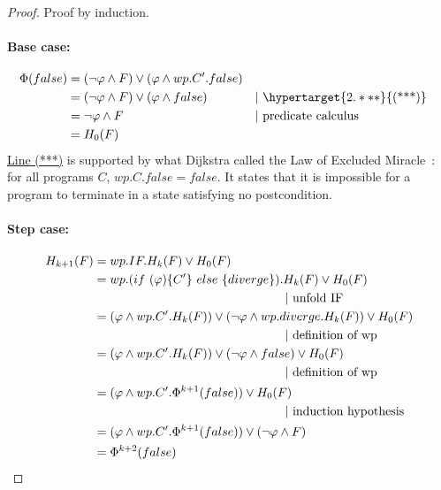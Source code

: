 \begin{proof}
Proof by induction. 
\vspace{-0.25cm}\paragraph{Base case: } 
  \begin{align*} 
    \Phi(false)   & = (\neg\varphi\wedge F)\vee(\varphi\wedge wp.C'.false)  & \\ 
                  & = (\neg\varphi\wedge F)\vee(\varphi\wedge false)         && |\ \hypertarget{2.***}{\text{(***)}}\\
                  & = \neg\varphi\wedge F                                    && |\ \text{predicate calculus} \\
                  & = H_0(F)
  \end{align*}
\hyperlink{2.***}{Line (***)} is supported by what Dijkstra called the Law of Excluded Miracle~\cite[p.18]{dijkstra76}: for all programs $C$, $wp.C.false = false$. 
It states that it is impossible for a program to terminate in a state satisfying no postcondition. 

\vspace{-0.25cm}\paragraph{Step case: } 
  \begin{align*} 
    H_{k+1}(F)     & = wp.IF.H_{k}(F) \vee H_0(F) \\
                  & = wp.(if\ (\varphi)\{C'\}\ else\ \{diverge\}).H_{k}(F) \vee H_0(F) \\
                  &\hspace{0.45\textwidth} | \ \text{unfold IF} \\
                  & = (\varphi\wedge wp.C'.H_{k}(F))\vee(\neg\varphi\wedge wp.diverge.H_{k}(F)) \vee H_0(F) \\ 
                  &\hspace{0.45\textwidth} | \ \text{definition of wp} \\
                  & = (\varphi\wedge wp.C'.H_{k}(F))\vee(\neg\varphi\wedge false) \vee H_0(F) \\
                  &\hspace{0.45\textwidth} | \ \text{definition of wp} \\
                  & = (\varphi\wedge wp.C'.\Phi^{k+1}(false)) \vee H_0(F)  \\
                  &\hspace{0.45\textwidth} | \ \text{induction hypothesis} \\
                  & = (\varphi\wedge wp.C'.\Phi^{k+1}(false)) \vee (\neg\varphi\wedge F)  \\
                  & = \Phi^{k+2}(false)  \\
  \end{align*}
\end{proof}
